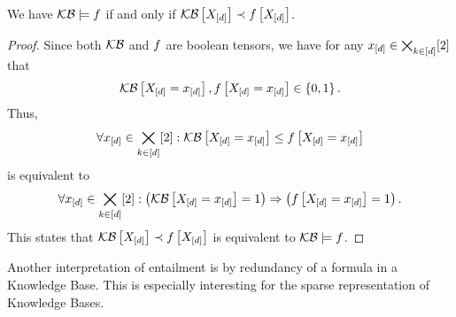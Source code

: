 \begin{theorem} \label{the:orderingEntailmentCriterion}
	We have $\mathcal{KB}\models f$ if and only if $\mathcal{KB}\left[X_{[d]}\right]\prec f\left[X_{[d]}\right]$.
\end{theorem}
\begin{proof}
	Since both $\mathcal{KB}$ and $f$ are boolean tensors, we have for any $x_{[d]}\in\bigtimes_{k\in[d]}[2]$ that
	\begin{align*}
		\mathcal{KB}\left[X_{[d]}=x_{[d]}\right],f\left[X_{[d]}=x_{[d]}\right]\in\{0,1\} \, .
	\end{align*}
	Thus,
	\begin{align*}
		\forall{x_{[d]}\in\bigtimes_{k\in[d]}[2]}:{\mathcal{KB}\left[X_{[d]}=x_{[d]}\right]\leq f\left[X_{[d]}=x_{[d]}\right]}
	\end{align*}
	is equivalent to
	\begin{align*}
		\forall{x_{[d]}\in\bigtimes_{k\in[d]}[2]}:{\left(\mathcal{KB}\left[X_{[d]}=x_{[d]}\right]=1\right)\Rightarrow\left(f\left[X_{[d]}=x_{[d]}\right]=1\right)} \, .
	\end{align*}
	This states that $\mathcal{KB}\left[X_{[d]}\right]\prec f\left[X_{[d]}\right]$ is equivalent to $\mathcal{KB}\models f$.
\end{proof}




Another interpretation of entailment is by redundancy of a formula in a Knowledge Base.
This is especially interesting for the sparse representation of Knowledge Bases.

